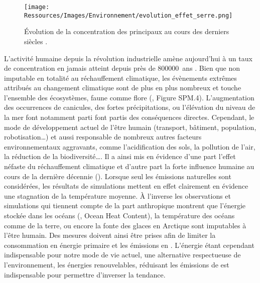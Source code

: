 \begin{figure}
    \centering
    \texttt{[image: Ressources/Images/Environnement/evolution\_effet\_serre.png]}
    \caption{Évolution de la concentration des principaux  au cours des
             derniers siècles \parencite{IPCC2014}.}
    \label{fig:evolution_effet_serre}
\end{figure}

L’activité humaine depuis la révolution industrielle amène aujourd’hui à un taux de
concentration en  jamais atteint depuis près de \SI{800000}{ans}
\parencite{IPCC2014}.
Bien que non imputable en totalité au réchauffement climatique, les évènements extrêmes
attribués au changement climatique sont de plus en plus nombreux et touche l’ensemble
des écosystèmes, faune comme flore (\cite{IPCC2014}, Figure SPM.4).
L’augmentation des occurrences de canicules, des fortes précipitations, ou
l’élévation du niveau de la mer font notamment parti font partis des conséquences
directes. Cependant, le mode de développement actuel de l’être humain (transport, bâtiment, population, robotisation\dots)
et aussi responsable de nombreux autres facteurs environnementaux aggravants, comme l’acidification des sols,
la pollution de l’air, la réduction de la biodiversité\dots \parencite{Biermann2016341}.
Il a ainsi mis en évidence d’une part l’effet néfaste du réchauffement climatique
et d’autre part la forte influence humaine au cours de la dernière décennie ().
Lorsque seul les émissions naturelles sont considérées, les résultats de simulations
mettent en effet clairement en évidence une stagnation de la température moyenne. À
l’inverse les observations et simulations qui tiennent compte de la part anthropique
montrent que l’énergie stockée dans les océans (, Ocean Heat Content), la température des océans comme de la
terre, ou encore la fonte des glaces en Arctique sont imputables à l’être humain.
Des mesures doivent ainsi être prises afin de limiter la consommation en énergie primaire
et les émissions en . L’énergie étant cependant indispensable pour notre mode de
vie actuel, une alternative respectueuse de l’environnement, les énergies renouvelables, réduisant les émissions de
 est indispensable pour permettre d’inverser la tendance.

